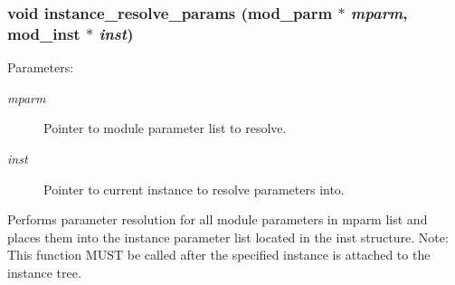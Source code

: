 \subsubsection{\setlength{\rightskip}{0pt plus 5cm}void instance\_\-resolve\_\-params ({\bf mod\_\-parm} $\ast$ {\em mparm}, {\bf mod\_\-inst} $\ast$ {\em inst})}\label{instance_8c_a5}


\begin{Desc}
\item[Parameters: ]\par
\begin{description}
\item[{\em 
mparm}]Pointer to module parameter list to resolve. \item[{\em 
inst}]Pointer to current instance to resolve parameters into.\end{description}
\end{Desc}
Performs parameter resolution for all module parameters in mparm list and places them into the instance parameter list located in the inst structure. Note: This function MUST be called after the specified instance is attached to the instance tree. 